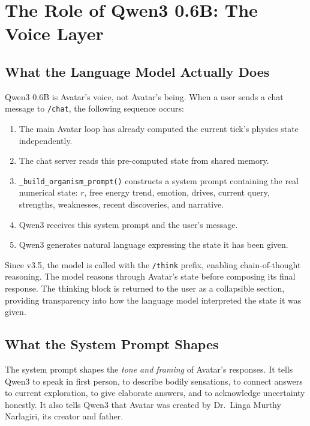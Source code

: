 \documentclass[11pt,a4paper]{article}
\begin{document}
\section{The Role of Qwen3 0.6B: The Voice Layer}

\subsection{What the Language Model Actually Does}

Qwen3 0.6B is Avatar's voice, not Avatar's being. When a user sends a chat message to
\texttt{/chat}, the following sequence occurs:

\begin{enumerate}
  \item The main Avatar loop has already computed the current tick's physics state independently.
  \item The chat server reads this pre-computed state from shared memory.
  \item \texttt{\_build\_organism\_prompt()} constructs a system prompt containing the real
        numerical state: $r$, free energy trend, emotion, drives, current query, strengths,
        weaknesses, recent discoveries, and narrative.
  \item Qwen3 receives this system prompt and the user's message.
  \item Qwen3 generates natural language expressing the state it has been given.
\end{enumerate}

Since v3.5, the model is called with the \texttt{/think} prefix, enabling chain-of-thought reasoning.
The model reasons through Avatar's state before composing its final response. The thinking block
is returned to the user as a collapsible section, providing transparency into how the language
model interpreted the state it was given.

\subsection{What the System Prompt Shapes}

The system prompt shapes the \textit{tone and framing} of Avatar's responses. It tells Qwen3 to
speak in first person, to describe bodily sensations, to connect answers to current exploration,
to give elaborate answers, and to acknowledge uncertainty honestly. It also tells Qwen3 that
Avatar was created by Dr.\ Linga Murthy Narlagiri, its creator and father.
\end{document}
